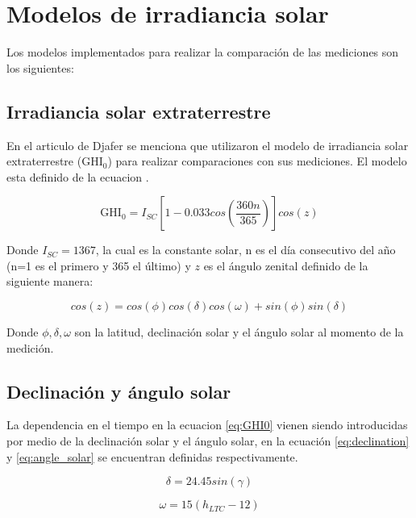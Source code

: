 \section{Modelos de irradiancia solar}

Los modelos implementados para realizar la comparación de las mediciones son los siguientes:

\subsection{Irradiancia solar extraterrestre}

En el articulo de Djafer\cite{Djafer_2017} se menciona que utilizaron el modelo de irradiancia solar extraterrestre (GHI$_0$) para realizar comparaciones con sus mediciones. El modelo esta definido de la ecuacion \label{eq:GHI0}.

\begin{equation}
  \text{GHI}_0 = I_{SC}\left[ 1-0.033 cos\left( \frac{360n}{365}  \right)\right] cos(z)  \label{eq:GHI0}
\end{equation}

Donde $I_{SC}=1367$, la cual es la constante solar, n es el día consecutivo del año (n=1 es el primero y 365 el último) y $z$ es el ángulo zenital definido de la  siguiente manera:

\begin{equation}
  cos(z) = cos(\phi)cos(\delta)cos(\omega)+sin(\phi)sin(\delta)
\end{equation}

Donde $\phi,\delta,\omega$ son la latitud, declinación solar y el ángulo solar al momento de la medición.


\subsection{Declinación y ángulo solar}

La dependencia en el tiempo en la ecuacion \ref{eq:GHI0} vienen siendo introducidas por medio de la declinación solar y el ángulo solar, en la ecuación \ref{eq:declination} y \ref{eq:angle_solar} se encuentran definidas respectivamente.

\begin{equation}
  \delta = 24.45 sin(\gamma)
  \label{eq:declination}
\end{equation}

\begin{equation}
  \omega = 15(h_{LTC}-12)
  \label{eq:angle_solar}
\end{equation}

